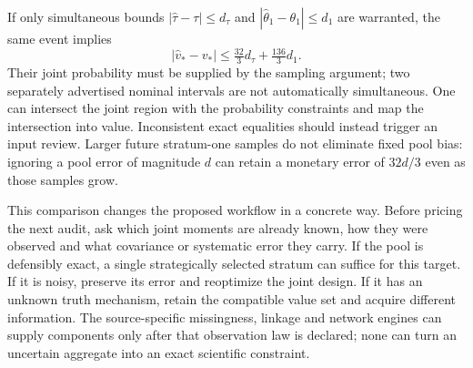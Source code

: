 If only simultaneous bounds $|\widehat\tau-\tau|\leq d_\tau$ and
$|\widehat\theta_1-\theta_1|\leq d_1$ are warranted, the same event implies
\begin{equation}
 |\widehat v_*-v_*|\leq\tfrac{32}{3}d_\tau+
                            \tfrac{136}{3}d_1.
 \label{exec17:s7-noisy-envelope}
\end{equation}
Their joint probability must be supplied by the sampling argument; two
separately advertised nominal intervals are not automatically simultaneous.
One can intersect the joint region with the probability constraints and map
the intersection into value. Inconsistent exact equalities should instead
trigger an input review. Larger future stratum-one samples do not eliminate
fixed pool bias: ignoring a pool error of magnitude $d$ can retain a monetary
error of $32d/3$ even as those samples grow.

This comparison changes the proposed workflow in a concrete way. Before
pricing the next audit, ask which joint moments are already known, how they
were observed and what covariance or systematic error they carry. If the
pool is defensibly exact, a single strategically selected stratum can suffice
for this target. If it is noisy, preserve its error and reoptimize the joint
design. If it has an unknown truth mechanism, retain the compatible value
set and acquire different information. The source-specific missingness,
linkage and network engines can supply components only after that observation
law is declared; none can turn an uncertain aggregate into an exact scientific
constraint.\citep{exec17_s7_extension}
